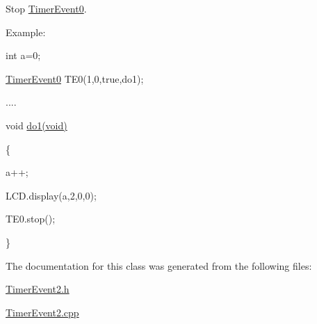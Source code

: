 \label{de/df5/class_timer_event2_a4cdefad3e8b4bc89911137b60f4db9d6}
\par
Stop \hyperlink{class_timer_event0}{TimerEvent0}.\par
 \par
Example:\par
\par
 int a=0; \par
 \hyperlink{class_timer_event0}{TimerEvent0} TE0(1,0,true,do1);\par
 .... \par
 void \hyperlink{main_8cpp_a6f6b769350d62a237ee918e52d844b28}{do1(void)}\par
 \{ \par
 a++; \par
 LCD.display(a,2,0,0);\par
 TE0.stop(); \par
 \}\par
 

The documentation for this class was generated from the following files:\begin{DoxyCompactItemize}
\item 
\hyperlink{_timer_event2_8h}{TimerEvent2.h}\item 
\hyperlink{_timer_event2_8cpp}{TimerEvent2.cpp}\end{DoxyCompactItemize}
